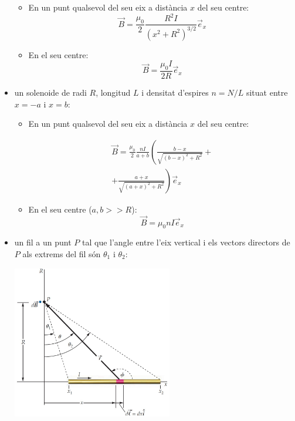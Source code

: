 \documentclass[../../../main.tex]{subfiles}
\begin{document}
\begin{multicols}{2}
\begin{itemize}
\begin{itemize}
                  \item En un punt qualsevol del seu eix a distància $x$ del seu centre: $$\Vec{B}=\frac{\mu_0}{2}\frac{R^2I}{(x^2+R^2)^{3/2}}\Vec{e}_x$$
                  \item En el seu centre: $$\Vec{B}=\frac{\mu_0I}{2R}\Vec{e}_x$$
              \end{itemize}
        \item un solenoide de radi $R$, longitud $L$ i densitat d'espires $n=N/L$ situat entre $x=-a$ i $x=b$:
              \begin{itemize}
                  \item En un punt qualsevol del seu eix a distància $x$ del seu centre:
                        \begin{footnotesize}
                            \begin{multline*} \Vec{B}=\frac{\mu_0}{2}\frac{nI}{a+b}\left(\frac{b-x}{\sqrt{(b-x)^2+R^2}}+\right.\\\left.+\frac{a+x}{\sqrt{(a+x)^2+R^2}}\right)\Vec{e}_x
                            \end{multline*}
                        \end{footnotesize}
                  \item En el seu centre ($a,b>>R$): $$\Vec{B}=\mu_0 nI\Vec{e}_x$$
              \end{itemize}
        \item un fil a un punt $P$ tal que l'angle entre l'eix vertical i els vectors directors de $P$ als extrems del fil són $\theta_1$ i $\theta_2$:\newline
              \begin{minipage}{\linewidth}
                  \centering
                  \includegraphics[width=7cm]{Physics/1st/Electricity_and_magnetism/Images/fil.jpg}
              \end{minipage}

\end{itemize}
\end{multicols}
\end{document}
